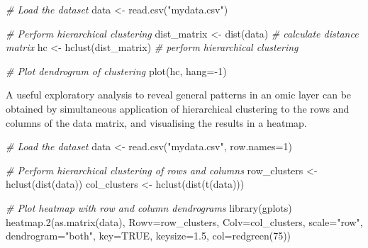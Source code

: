 \documentclass[
]{book}
\newenvironment{Shaded}{\begin{snugshade}}{\end{snugshade}}
\newcommand{\AttributeTok}[1]{\textcolor[rgb]{0.77,0.63,0.00}{#1}}
\newcommand{\CommentTok}[1]{\textcolor[rgb]{0.56,0.35,0.01}{\textit{#1}}}
\newcommand{\ConstantTok}[1]{\textcolor[rgb]{0.00,0.00,0.00}{#1}}
\newcommand{\DecValTok}[1]{\textcolor[rgb]{0.00,0.00,0.81}{#1}}
\newcommand{\FloatTok}[1]{\textcolor[rgb]{0.00,0.00,0.81}{#1}}
\newcommand{\FunctionTok}[1]{\textcolor[rgb]{0.00,0.00,0.00}{#1}}
\newcommand{\NormalTok}[1]{#1}
\newcommand{\OtherTok}[1]{\textcolor[rgb]{0.56,0.35,0.01}{#1}}
\newcommand{\SpecialCharTok}[1]{\textcolor[rgb]{0.00,0.00,0.00}{#1}}
\newcommand{\StringTok}[1]{\textcolor[rgb]{0.31,0.60,0.02}{#1}}
\begin{document}
\begin{Shaded}
\begin{Highlighting}[]
\CommentTok{\# Load the dataset}
\NormalTok{data }\OtherTok{\textless{}{-}} \FunctionTok{read.csv}\NormalTok{(}\StringTok{"mydata.csv"}\NormalTok{)}

\CommentTok{\# Perform hierarchical clustering}
\NormalTok{dist\_matrix }\OtherTok{\textless{}{-}} \FunctionTok{dist}\NormalTok{(data)  }\CommentTok{\# calculate distance matrix}
\NormalTok{hc }\OtherTok{\textless{}{-}} \FunctionTok{hclust}\NormalTok{(dist\_matrix)  }\CommentTok{\# perform hierarchical clustering}

\CommentTok{\# Plot dendrogram of clustering}
\FunctionTok{plot}\NormalTok{(hc, }\AttributeTok{hang=}\SpecialCharTok{{-}}\DecValTok{1}\NormalTok{)}
\end{Highlighting}
\end{Shaded}

A useful exploratory analysis to reveal general patterns in an omic layer can be obtained by simultaneous application of hierarchical clustering to the rows and columns of the data matrix, and visualising the results in a heatmap.

\begin{Shaded}
\begin{Highlighting}[]
\CommentTok{\# Load the dataset}
\NormalTok{data }\OtherTok{\textless{}{-}} \FunctionTok{read.csv}\NormalTok{(}\StringTok{"mydata.csv"}\NormalTok{, }\AttributeTok{row.names=}\DecValTok{1}\NormalTok{)}

\CommentTok{\# Perform hierarchical clustering of rows and columns}
\NormalTok{row\_clusters }\OtherTok{\textless{}{-}} \FunctionTok{hclust}\NormalTok{(}\FunctionTok{dist}\NormalTok{(data))}
\NormalTok{col\_clusters }\OtherTok{\textless{}{-}} \FunctionTok{hclust}\NormalTok{(}\FunctionTok{dist}\NormalTok{(}\FunctionTok{t}\NormalTok{(data)))}

\CommentTok{\# Plot heatmap with row and column dendrograms}
\FunctionTok{library}\NormalTok{(gplots)}
\FunctionTok{heatmap.2}\NormalTok{(}\FunctionTok{as.matrix}\NormalTok{(data),}
          \AttributeTok{Rowv=}\NormalTok{row\_clusters,}
          \AttributeTok{Colv=}\NormalTok{col\_clusters,}
          \AttributeTok{scale=}\StringTok{"row"}\NormalTok{,}
          \AttributeTok{dendrogram=}\StringTok{"both"}\NormalTok{,}
          \AttributeTok{key=}\ConstantTok{TRUE}\NormalTok{,}
          \AttributeTok{keysize=}\FloatTok{1.5}\NormalTok{,}
          \AttributeTok{col=}\FunctionTok{redgreen}\NormalTok{(}\DecValTok{75}\NormalTok{))}
\end{Highlighting}
\end{Shaded}
\end{document}
